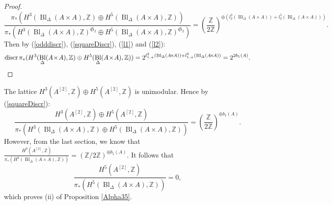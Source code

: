 \documentclass{alggeom}
\DeclareMathOperator{\discr}{discr}
\DeclareMathOperator{\Bl}{Bl}
\newcommand{\Z}{\mathbb{Z}}
\theoremstyle{plain}
\theoremstyle{definition}
\theoremstyle{remark}
\begin{document}
\begin{proof}
$$\frac{\pi_*(H^3(\Bl_\Delta(A\! \times\! A),\Z)\oplus H^5(\Bl_\Delta(A\! \times\! A),\Z))}{\pi_*(H^3(\Bl_\Delta(A\! \times\! A),\Z)^{\mathfrak{S}_2}\oplus H^5(\Bl_\Delta(A\! \times\! A),\Z)^{\mathfrak{S}_2})}=\left(\frac{\Z}{2\Z}\right)^{\oplus \left(l_2^3(\Bl_\Delta(A\! \times\! A))+l_2^5(\Bl_\Delta(A\! \times\! A))\right)}.$$
Then by (\ref{odddiscr}), (\ref{squareDiscr}), (\ref{l1}) and (\ref{l2}):
\begin{equation*}
\discr \pi_{*}(H^{3}(\Bl_\Delta(A\! \times\! A),\Z)\oplus H^{5}(\Bl_\Delta(A\! \times\! A),\Z))=2^{l_{1,+}^3(\Bl_\Delta(A\! \times\! A))+l_{1,+}^5(\Bl_\Delta(A\! \times\! A))}=2^{2b_1(A)}.
\qedhere
\end{equation*}
\end{proof}
The lattice $H^{3}(A^{[2]},\Z)\oplus H^{5}(A^{[2]},\Z)$ is unimodular. Hence by (\ref{squareDiscr}):
$$\frac{H^{3}(A^{[2]},\Z)\oplus H^{5}(A^{[2]},\Z)}{\pi_{*}(H^{3}(\Bl_\Delta(A\! \times\! A),\Z)\oplus H^{5}(\Bl_\Delta(A\! \times\! A),\Z))}=\left(\frac{\Z}{2\Z}\right)^{\oplus b_1(A)}.$$
However, from the last section, we know that $\frac{H^{3}(A^{[2]},\Z)}{\pi_{*}(H^{3}(\Bl_\Delta(A\! \times\! A),\Z))}=(\Z/2\Z)^{\oplus b_1(A)}$.
It follows that
$$
\frac{H^{5}(A^{[2]},\Z)}{\pi_{*}(H^{5}(\Bl_\Delta(A\! \times\! A),\Z))}={0},
$$
which proves (ii) of Proposition \ref{Alpha35}.
\end{document}
